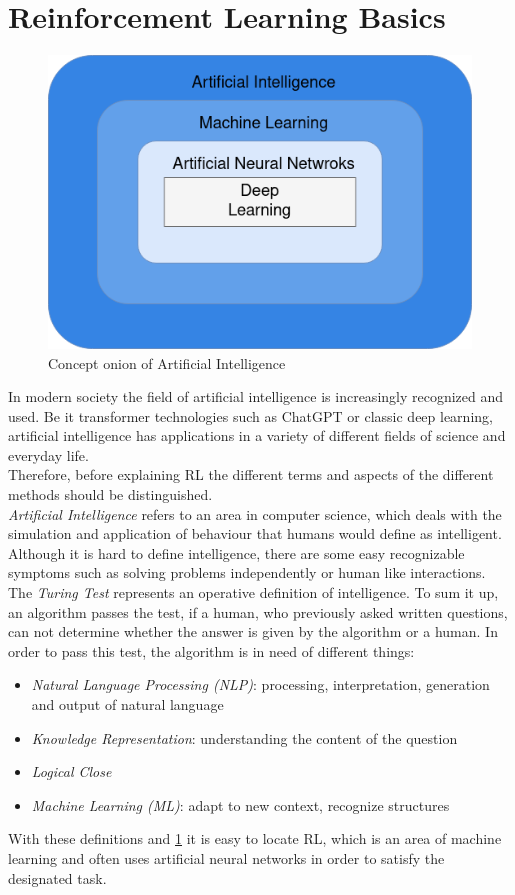 \section{Reinforcement Learning Basics}
\begin{figure}
	\centering
	\includegraphics[width= 0.75 \linewidth]{figures/onion.png}
	\caption{Concept onion of Artificial Intelligence \cite{NN}}
	\label{fig:onion}
\end{figure}
In modern society the field of artificial intelligence is increasingly recognized and used. 
Be it transformer technologies such as ChatGPT or classic deep learning, artificial intelligence has applications in a variety of different fields of science and everyday life.\\
Therefore, before explaining RL the different terms and aspects of the different methods should be distinguished.\\
\emph{Artificial Intelligence} refers to an area in computer science, 
which deals with the simulation and application of behaviour that humans would define as intelligent. 
Although it is hard to define intelligence, there are some easy recognizable symptoms such as solving problems independently or human like interactions. 
The \emph{Turing Test} \cite{TT} represents an operative definition of intelligence. 
To sum it up, an algorithm passes the test, if a human, who previously asked written questions, 
can not determine whether the answer is given by the algorithm or a human. 
In order to pass this test, the algorithm is in need of different things:
\begin{itemize}
	\item \emph{Natural Language Processing (NLP)}: processing, interpretation, generation and output of natural language
	\item \emph{Knowledge Representation}: understanding the content of the question
	\item \emph{Logical Close}
	\item \emph{Machine Learning (ML)}: adapt to new context, recognize structures
\end{itemize}
With these definitions and \cref{fig:onion} it is easy to locate RL, 
which is an area of machine learning and often uses artificial neural networks in order to satisfy the designated task.

